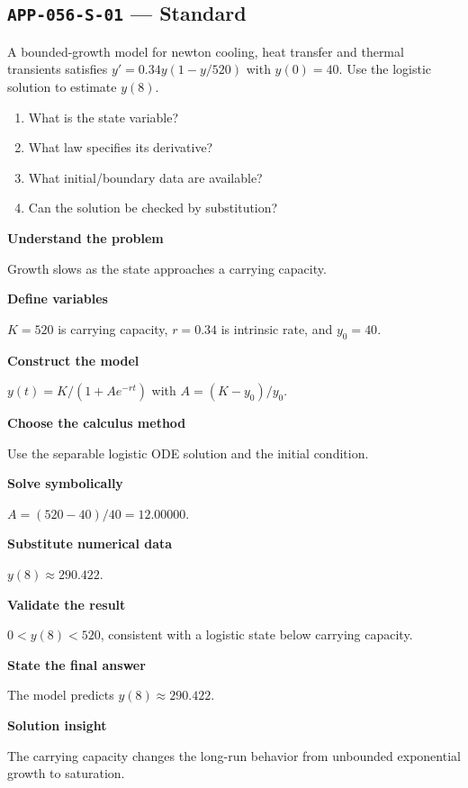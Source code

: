 \documentclass[11pt]{book}
\newcommand{\pid}[1]{\texttt{#1}}
\begin{document}
\subsection*{\pid{APP-056-S-01} — Standard}
\begin{problembox}
A bounded-growth model for newton cooling, heat transfer and thermal transients satisfies $y'=0.34y(1-y/520)$ with $y(0)=40$. Use the logistic solution to estimate $y(8)$.
\end{problembox}
\begin{promptbox}\begin{enumerate}
\item What is the state variable?
\item What law specifies its derivative?
\item What initial/boundary data are available?
\item Can the solution be checked by substitution?
\end{enumerate}\end{promptbox}
\begin{solutionbox}
\textbf{Understand the problem}\par Growth slows as the state approaches a carrying capacity.\par\medskip
\textbf{Define variables}\par $K=520$ is carrying capacity, $r=0.34$ is intrinsic rate, and $y_0=40$.\par\medskip
\textbf{Construct the model}\par $y(t)=K/(1+A e^{-rt})$ with $A=(K-y_0)/y_0$.\par\medskip
\textbf{Choose the calculus method}\par Use the separable logistic ODE solution and the initial condition.\par\medskip
\textbf{Solve symbolically}\par $A=(520-40)/40=12.00000$.\par\medskip
\textbf{Substitute numerical data}\par $y(8)\approx 290.422$.\par\medskip
\textbf{Validate the result}\par $0<y(8)<520$, consistent with a logistic state below carrying capacity.\par\medskip
\textbf{State the final answer}\par The model predicts $y(8)\approx 290.422$.\par\medskip
\textbf{Solution insight}\par The carrying capacity changes the long-run behavior from unbounded exponential growth to saturation.\par\medskip
\end{solutionbox}
\end{document}
